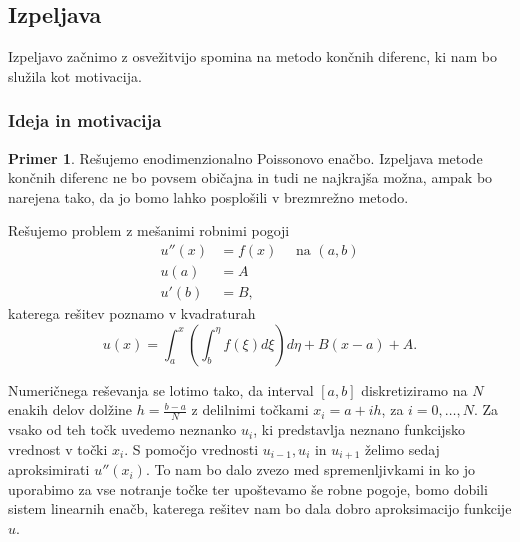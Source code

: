 \documentclass[12pt,a4paper]{article}
\theoremstyle{definition} %
\newtheorem{primer}[definicija]{Primer}
\theoremstyle{plain} %
\numberwithin{equation}{section}
\begin{document}
\subsection{Izpeljava}

Izpeljavo začnimo z osvežitvijo spomina na metodo končnih diferenc, ki nam bo
služila kot motivacija.

\subsubsection{Ideja in motivacija}

\begin{primer}
\label{prim:fdm}
Rešujemo enodimenzionalno Poissonovo enačbo. Izpeljava metode končnih diferenc
ne bo povsem običajna in tudi ne najkrajša možna, ampak bo narejena tako, da
jo bomo lahko posplošili v brezmrežno metodo.

Rešujemo problem z mešanimi robnimi pogoji
\begin{align}
  u''(x) &= f(x) \quad \text{ na } (a, b) \label{eq:example-prob} \\
  u(a) &= A \nonumber \\
  u'(b) &= B, \nonumber
\end{align}
katerega rešitev poznamo v kvadraturah
\[
  u(x) = \int_a^x\left(\int_b^\eta f(\xi) d\xi \right) d\eta + B(x-a) + A.
\]

Numeričnega reševanja se lotimo tako, da interval $[a, b]$ diskretiziramo na
$N$ enakih delov dolžine $h = \frac{b-a}{N}$ z delilnimi točkami $x_i = a + i h$, za $i = 0,
\dots, N$. Za vsako od teh točk uvedemo neznanko $u_i$, ki predstavlja
neznano funkcijsko vrednost v točki $x_i$. S pomočjo vrednosti $u_{i-1}, u_i$
in $u_{i+1}$ želimo sedaj aproksimirati $u''(x_i)$. To nam bo dalo zvezo med
spremenljivkami in ko jo uporabimo za vse notranje točke ter upoštevamo še
robne pogoje, bomo dobili sistem linearnih enačb, katerega rešitev nam bo dala
dobro aproksimacijo funkcije $u$.


\end{primer}
\end{document}
